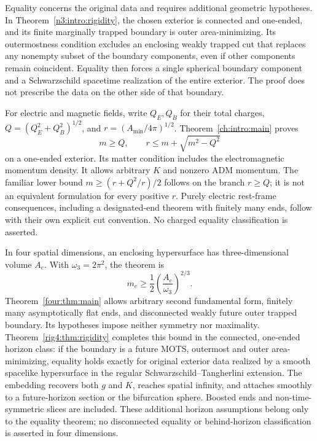 Equality concerns the original data and requires additional geometric
hypotheses. In Theorem~\ref{n3:intro:rigidity}, the chosen exterior is
connected and one-ended, and its finite marginally trapped boundary
is outer area-minimizing. Its outermostness condition excludes an
enclosing weakly trapped cut that replaces any nonempty subset of the
boundary components, even if other components remain coincident.
Equality then forces a single spherical boundary component and a
Schwarzschild spacetime realization of the entire exterior. The proof
does not prescribe the data on the other side of that boundary.

For electric and magnetic fields, write $Q_E,Q_B$ for their total
charges, $Q=(Q_E^2+Q_B^2)^{1/2}$, and
$r=(A_{\min}/4\pi)^{1/2}$. Theorem~\ref{ch:intro:main} proves
\[
             m\ge Q,\qquad r\le m+\sqrt{m^2-Q^2}
\]
on a one-ended exterior. Its matter condition includes the
electromagnetic momentum density. It allows arbitrary $K$ and nonzero
ADM momentum. The familiar lower bound
$m\ge(r+Q^2/r)/2$ follows on the branch $r\ge Q$; it is not an equivalent
formulation for every positive $r$. Purely electric rest-frame
consequences, including a designated-end theorem with finitely many
ends, follow with their own explicit cut convention. No charged
equality classification is asserted.

In four spatial dimensions, an enclosing hypersurface has
three-dimensional volume $A_e$. With $\omega_3=2\pi^2$, the theorem is
\[
              m_e\ge\frac12\left(\frac{A_e}{\omega_3}\right)^{2/3}.
\]
Theorem~\ref{four:thm:main} allows arbitrary second fundamental form,
finitely many asymptotically flat ends, and disconnected weakly future
outer trapped boundary. Its hypotheses impose neither symmetry nor
maximality. Theorem~\ref{rig4:thm:rigidity} completes this bound in the
connected, one-ended horizon class: if the boundary is a future MOTS,
outermost and outer area-minimizing, equality holds exactly for original
exterior data realized by a smooth spacelike hypersurface in the regular
Schwarzschild--Tangherlini extension. The embedding recovers both $g$ and
$K$, reaches spatial infinity, and attaches smoothly to a future-horizon
section or the bifurcation sphere. Boosted ends and non-time-symmetric
slices are included. These additional horizon assumptions belong only
to the equality theorem; no disconnected equality or behind-horizon
classification is asserted in four dimensions.

